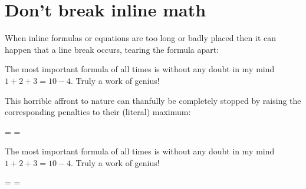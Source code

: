 \documentclass[a4paper, 10pt, abstract=on, headings=standardclasses]{scrartcl}
\begin{document}
\section{Don’t break inline math}
\label{breaking inline math}

When inline formulas or equations are too long or badly placed then it can happen that a line break occurs, tearing the formula apart:
\begin{LTXexample}[pos = b]
  The most important formula of all times is without any doubt in my mind $1 + 2 + 3 = 10 - 4$.
  Truly a work of genius!
\end{LTXexample}
This horrible affront to nature can thanfully be completely stopped by raising the corresponding penalties to their (literal) maximum:
\begin{LTXexample}[pos = b]
  \binoppenalty = \maxdimen
  \relpenalty = \maxdimen
  
  The most important formula of all times is without any doubt in my mind $1 + 2 + 3 = 10 - 4$.
  Truly a work of genius!
\end{LTXexample}
\binoppenalty = \maxdimen
\relpenalty = \maxdimen




% 
\end{document}
